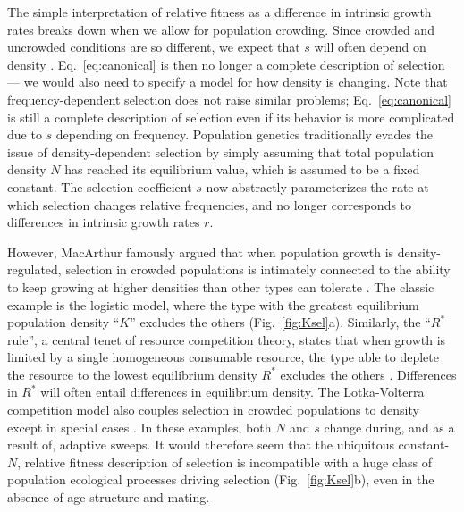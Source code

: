 \documentclass[12pt]{article}
\begin{document}
The simple interpretation of relative fitness as a difference in intrinsic growth rates breaks down when we allow for population crowding. Since crowded and uncrowded conditions are so different, we expect that $s$ will often depend on density \citep{travis_2013}. Eq.~\eqref{eq:canonical} is then no longer a complete description of selection --- we would also need to specify a model for how density is changing. Note that frequency-dependent selection does not raise similar problems; Eq.~\eqref{eq:canonical} is still a complete description of selection even if its behavior is more complicated due to $s$ depending on frequency. Population genetics traditionally evades the issue of density-dependent selection by simply assuming that total population density $N$ has reached its equilibrium value, which is assumed to be a fixed constant. The selection coefficient $s$ now abstractly parameterizes the rate at which selection changes relative frequencies, and no longer corresponds to differences in intrinsic growth rates $r$. 

However, MacArthur famously argued that when population growth is density-regulated, selection in crowded populations is intimately connected to the ability to keep growing at higher densities than other types can tolerate \citep{macarthur_1967}. The classic example is the logistic model, where the type with the greatest equilibrium population density ``$K$'' excludes the others (Fig.~\ref{fig:Ksel}a). Similarly, the ``$R^*$ rule'', a central tenet of resource competition theory, states that when growth is limited by a single homogeneous consumable resource, the type able to deplete the resource to the lowest equilibrium density $R^*$ excludes the others \citep{grover_1997}. Differences in $R^*$ will often entail differences in equilibrium density. The Lotka-Volterra competition model also couples selection in crowded populations to density except in special cases \citep{smouse_1976,mallet_2012}. In these examples, both $N$ and $s$ change during, and as a result of, adaptive sweeps. It would therefore seem that the ubiquitous constant-$N$, relative fitness description of selection is incompatible with a huge class of population ecological processes driving selection (Fig.~\ref{fig:Ksel}b), even in the absence of age-structure and mating.
\end{document}
